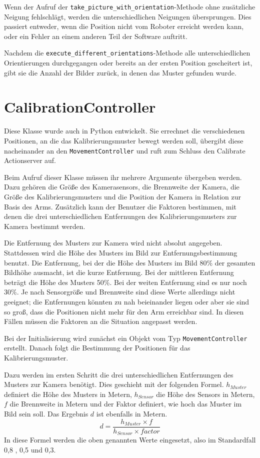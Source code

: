 Wenn der Aufruf der \texttt{take\_picture\_with\_orientation}-Methode ohne zusätzliche Neigung fehlschlägt, werden die unterschiedlichen Neigungen übersprungen. Dies passiert entweder, wenn die Position nicht vom Roboter erreicht werden kann, oder ein Fehler an einem anderen Teil der Software auftritt.

Nachdem die \texttt{execute\_different\_orientations}-Methode alle unterschiedlichen Orientierungen durchgegangen oder bereits an der ersten Position gescheitert ist, gibt sie die Anzahl der Bilder zurück, in denen das Muster gefunden wurde.

\section{CalibrationController} %
\label{sec:calibrationcontroller_impl}
Diese Klasse wurde auch in Python entwickelt. Sie errechnet die verschiedenen Positionen, an die das Kalibrierungsmuster bewegt werden soll, übergibt diese nacheinander an den \texttt{MovementController} und ruft zum Schluss den Calibrate Actionserver auf.

Beim Aufruf dieser Klasse müssen ihr mehrere Argumente übergeben werden. Dazu gehören die Größe des Kamerasensors, die Brennweite der Kamera, die Größe des Kalibrierungsmusters und die Position der Kamera in Relation zur Basis des Arms. Zusätzlich kann der Benutzer die Faktoren bestimmen, mit denen die drei unterschiedlichen Entfernungen des Kalibrierungsmusters zur Kamera bestimmt werden. 

Die Entfernung des Musters zur Kamera wird nicht absolut angegeben. Stattdessen wird die Höhe des Musters im Bild zur Entfernungsbestimmung benutzt. Die Entfernung, bei der die Höhe des Musters im Bild 80\% der gesamten Bildhöhe ausmacht, ist die kurze Entfernung. Bei der mittleren Entfernung beträgt die Höhe des Musters 50\%. Bei der weiten Entfernung sind es nur noch 30\%. Je nach Sensorgröße und Brennweite sind diese Werte allerdings nicht geeignet; die Entfernungen könnten zu nah beieinander liegen oder aber sie sind so groß, dass die Positionen nicht mehr für den Arm erreichbar sind. In diesen Fällen müssen die Faktoren an die Situation angepasst werden.

Bei der Initialisierung wird zunächst ein Objekt vom Typ \texttt{MovementController} erstellt. Danach folgt die Bestimmung der Positionen für das Kalibrierungsmuster.

Dazu werden im ersten Schritt die drei unterschiedlichen Entfernungen des Musters zur Kamera benötigt. Dies geschieht mit der folgenden Formel. $h_{Muster}$ definiert die Höhe des Musters in Metern, $h_{Sensor}$ die Höhe des Sensors in Metern, $f$ die Brennweite in Metern und der Faktor definiert, wie hoch das Muster im Bild sein soll. Das Ergebnis $d$ ist ebenfalls in Metern.
\begin{equation}
	d = \frac{h_{Muster} \times f }{h_{Sensor} \times factor}
\end{equation}
In diese Formel werden die oben genannten Werte eingesetzt, also im Standardfall 0,8 , 0,5 und 0,3.

